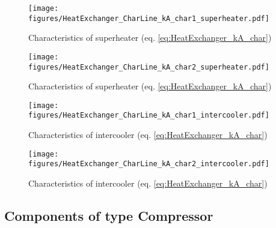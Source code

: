 \begin{minipage}{0.5\textwidth}
\begin{figure}[H]\begin{center}
\texttt{[image: figures/HeatExchanger\_CharLine\_kA\_char1\_superheater.pdf]}
\caption{Characteristics of superheater (eq. \ref{eq:HeatExchanger_kA_char})}
\label{fig:CharLine_kA_char1_superheater}
\end{center}\end{figure}

\end{minipage}
\begin{minipage}{0.5\textwidth}
\begin{figure}[H]\begin{center}
\texttt{[image: figures/HeatExchanger\_CharLine\_kA\_char2\_superheater.pdf]}
\caption{Characteristics of superheater (eq. \ref{eq:HeatExchanger_kA_char})}
\label{fig:CharLine_kA_char2_superheater}
\end{center}\end{figure}

\end{minipage}

\begin{minipage}{0.5\textwidth}
\begin{figure}[H]\begin{center}
\texttt{[image: figures/HeatExchanger\_CharLine\_kA\_char1\_intercooler.pdf]}
\caption{Characteristics of intercooler (eq. \ref{eq:HeatExchanger_kA_char})}
\label{fig:CharLine_kA_char1_intercooler}
\end{center}\end{figure}

\end{minipage}
\begin{minipage}{0.5\textwidth}
\begin{figure}[H]\begin{center}
\texttt{[image: figures/HeatExchanger\_CharLine\_kA\_char2\_intercooler.pdf]}
\caption{Characteristics of intercooler (eq. \ref{eq:HeatExchanger_kA_char})}
\label{fig:CharLine_kA_char2_intercooler}
\end{center}\end{figure}

\end{minipage}


\subsection{Components of type Compressor}

